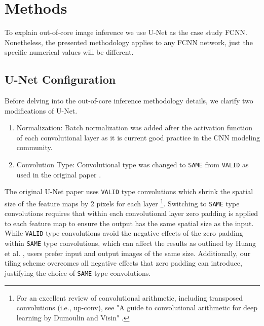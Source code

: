 \documentclass[runningheads]{llncs}
\begin{document}
\section{Methods}
\label{methods}

To explain out-of-core image inference we use U-Net \cite{Ronneberger2015a} as the case study FCNN. Nonetheless, the presented methodology applies to any FCNN network, just the specific numerical values will be different. 

\subsection{U-Net Configuration}

Before delving into the out-of-core inference methodology details, we clarify two modifications of U-Net. 

\begin{enumerate}
	\item Normalization: Batch normalization \cite{ioffe2015batch} was added after the activation function of each convolutional layer as it is current good practice in the CNN modeling community. 
	\item Convolution Type: Convolutional type was changed to \texttt{SAME} from \texttt{VALID} as used in the original paper \cite{Ronneberger2015a}.
\end{enumerate}

The original U-Net paper uses \texttt{VALID} type convolutions which shrink the spatial size of the feature maps by 2 pixels for each layer \cite{Dumoulin2018}\footnote{For an excellent review of convolutional arithmetic, including transposed convolutions (i.e., up-conv), see "A guide to convolutional arithmetic for deep learning by Dumoulin and Visin" \cite{Dumoulin2018}.}. 
Switching to \texttt{SAME} type convolutions requires that within each convolutional layer zero padding is applied to each feature map to ensure the output has the same spatial size as the input. 
While \texttt{VALID} type convolutions avoid the negative effects of the zero padding within \texttt{SAME} type convolutions, which can affect the results as outlined by Huang et al. \cite{Huang2019a}, users prefer input and output images of the same size. Additionally, our tiling scheme overcomes all negative effects that zero padding can introduce, justifying the choice of \texttt{SAME} type convolutions. 
\end{document}
